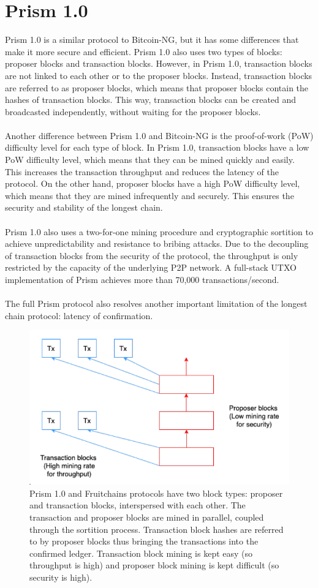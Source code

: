 \section{Prism 1.0 }
Prism 1.0 is a similar protocol to Bitcoin-NG, but it has some differences that make it more secure and efficient. Prism 1.0 also uses two types of blocks: proposer blocks and transaction blocks. However, in Prism 1.0, transaction blocks are not linked to each other or to the proposer blocks. Instead, transaction blocks are referred to as proposer blocks, which means that proposer blocks contain the hashes of transaction blocks. This way, transaction blocks can be created and broadcasted independently, without waiting for the proposer blocks.\\\\
Another difference between Prism 1.0 and Bitcoin-NG is the proof-of-work (PoW) difficulty level for each type of block. In Prism 1.0, transaction blocks have a low PoW difficulty level, which means that they can be mined quickly and easily. This increases the transaction throughput and reduces the latency of the protocol. On the other hand, proposer blocks have a high PoW difficulty level, which means that they are mined infrequently and securely. This ensures the security and stability of the longest chain.\\\\
Prism 1.0 also uses a two-for-one mining procedure and cryptographic sortition to achieve unpredictability and resistance to bribing attacks. Due to the decoupling of transaction blocks from the security of the protocol, the throughput
is only restricted by the capacity of the underlying P2P network. A full-stack UTXO implementation
of Prism achieves more than 70,000 transactions/second.\\\\
The full Prism protocol also resolves another important limitation of the longest chain protocol: latency of
confirmation.
\begin{figure}[h!]
    \centering
    \includegraphics[width=0.5\linewidth]{Fig/08/F5}
    \caption{Prism 1.0 and Fruitchains protocols have two block types: proposer and transaction blocks,
        interspersed with each other. The transaction and proposer blocks are mined in parallel, coupled
        through the sortition process. Transaction block hashes are referred to by proposer blocks thus
        bringing the transactions into the confirmed ledger. Transaction block mining is kept easy (so
        throughput is high) and proposer block mining is kept difficult (so security is high).}
    \label{fig:f5}
\end{figure}

